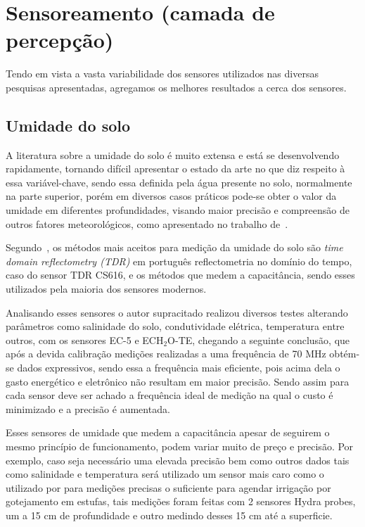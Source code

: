 \documentclass[
article,			%
12pt,				%
oneside,			%
a4paper,			%
english,			%
brazil,				%
sumario=tradicional
]{abntex2}
\begin{document}
\section{Sensoreamento (camada de percepção)}\label{Sensoreamento do solo (camada de percepção)}

Tendo em vista a vasta variabilidade dos sensores utilizados nas diversas pesquisas apresentadas, agregamos os melhores resultados a cerca dos sensores.

\subsection{Umidade do solo}\label{Umidade do solo}

A literatura sobre a umidade do solo é muito extensa e está se desenvolvendo rapidamente, tornando difícil apresentar o estado da arte\cite{11} no que diz respeito à essa variável-chave, sendo essa definida pela água presente no solo\cite{11}, normalmente na parte superior, porém em diversos casos práticos pode-se obter o valor da umidade em diferentes profundidades, visando maior precisão e compreensão de outros fatores meteorológicos, como apresentado no trabalho de~\citeauthor{12}.

Segundo~\citeauthor{3}, os métodos mais aceitos para medição da umidade do solo são \textit{time domain reflectometry (TDR)} em português reflectometria no domínio do tempo, caso do sensor TDR CS616\cite{12}, e os métodos que medem a capacitância, sendo esses utilizados pela maioria dos sensores modernos.

Analisando esses sensores o autor supracitado\cite{3} realizou diversos testes alterando parâmetros como salinidade do solo, condutividade elétrica, temperatura entre outros, com os sensores EC-5 e ECH$_2$O-TE, chegando a seguinte conclusão, que após a devida calibração medições realizadas a uma frequência de 70 MHz obtém-se dados expressivos, sendo essa a frequência mais eficiente, pois acima dela o gasto energético  e eletrônico não resultam em maior precisão. Sendo assim para cada sensor deve ser achado a frequência ideal de medição na qual o custo é minimizado e a precisão é aumentada.

Esses sensores de umidade que medem a capacitância apesar de seguirem o mesmo princípio de funcionamento, podem variar muito de preço e precisão. Por exemplo, caso seja necessário uma elevada precisão bem como outros dados tais como salinidade e temperatura será utilizado um sensor mais caro como o utilizado por \citeauthor{12} para medições precisas o suficiente para agendar irrigação por gotejamento em estufas, tais medições foram feitas com 2 sensores Hydra probes, um a 15 cm de profundidade e outro medindo desses 15 cm até a superficie.
\end{document}
